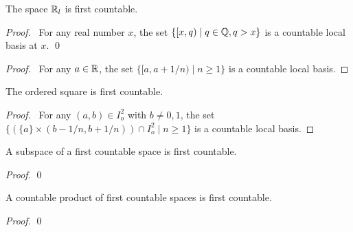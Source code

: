 \begin{example}
    The space $\mathbb{R}_l$ is first countable.

    \begin{proof}
        \pf\ For any real number $x$, the set $\{ [x,q) \mid q \in \mathbb{Q}, q > x \}$
        is a countable local basis at $x$. \qed
    \end{proof}
\end{example}

\begin{proof}
    \pf\ For any $a \in \mathbb{R}$, the set $\{ [a,a + 1/n) \mid n \geq 1 \}$ is a countable local basis.
\end{proof}

\begin{example}
    The ordered square is first countable.
\end{example}

\begin{proof}
    \pf\ For any $(a,b) \in I_o^2$ with $b \neq 0,1$, the set $\{ (\{a\} \times (b - 1/n,b + 1/n)) \cap I_o^2 \mid n \geq 1 \}$ is a countable local basis.
\end{proof}

\begin{proposition}
    A subspace of a first countable space is first countable.
\end{proposition}

\begin{proof}
    \pf
    \qed
\end{proof}

\begin{proposition}[AC]
    A countable product of first countable spaces is first countable.
\end{proposition}

\begin{proof}
    \pf
    \qed
\end{proof}

